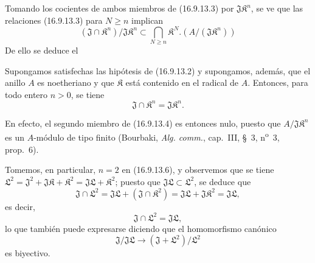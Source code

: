 Tomando los cocientes de ambos miembros de (16.9.13.3) por
$\mathfrak{J}\mathfrak{K}^n$, se ve que las relaciones (16.9.13.3) para
$N\geq n$ implican
\[
  (\mathfrak{J}\cap\mathfrak{K}^n)/\mathfrak{J}\mathfrak{K}^n
  \subset\bigcap_{N\geq n}\mathfrak{K}^N
    .(A/(\mathfrak{J}\mathfrak{K}^n))
  \tag{16.9.13.4}
  \label{IV.16.9.13.4}
\]
De ello se deduce el

\begin{corollary}[16.9.13.5]
\label{IV.16.9.13.5}
Supongamos satisfechas las hipótesis de \textup{(16.9.13.2)} y supongamos, además, que
el anillo $A$ es noetheriano y que $\mathfrak{K}$ está contenido en el radical
de $A$. Entonces, para todo entero $n>0$, se tiene
\[
  \mathfrak{J}\cap\mathfrak{K}^n=\mathfrak{J}\mathfrak{K}^n.
  \tag{16.9.13.6}
  \label{IV.16.9.13.6}
\]
\end{corollary}

En efecto, el segundo miembro de (16.9.13.4) es entonces nulo, puesto que
$A/\mathfrak{J}\mathfrak{K}^n$ es un $A$-módulo de tipo finito (Bourbaki,
\emph{Alg. comm.}, cap.~III, §~3, n\textsuperscript{o}~3, prop.~6).

Tomemos, en particular, $n=2$ en (16.9.13.6), y observemos que se tiene
$\mathfrak{L}^2=\mathfrak{J}^2+\mathfrak{J}\mathfrak{K}+\mathfrak{K}^2
=\mathfrak{J}\mathfrak{L}+\mathfrak{K}^2$; puesto que
$\mathfrak{J}\mathfrak{L}\subset\mathfrak{L}^2$, se deduce que
\[
  \mathfrak{J}\cap\mathfrak{L}^2
  =\mathfrak{J}\mathfrak{L}+(\mathfrak{J}\cap\mathfrak{K}^2)
  =\mathfrak{J}\mathfrak{L}+\mathfrak{J}\mathfrak{K}^2
  =\mathfrak{J}\mathfrak{L},
\]
es decir,
\[
  \mathfrak{J}\cap\mathfrak{L}^2=\mathfrak{J}\mathfrak{L},
  \tag{16.9.13.7}
  \label{IV.16.9.13.7}
\]
lo que también puede expresarse diciendo que el homomorfismo canónico
\[
  \mathfrak{J}/\mathfrak{J}\mathfrak{L}
  \longrightarrow(\mathfrak{J}+\mathfrak{L}^2)/\mathfrak{L}^2
\]
es biyectivo.

